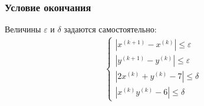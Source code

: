\subsubsection*{Условие окончания}
Величины \(\varepsilon\) и \(\delta\) задаются самостоятельно:
\begin{align}
	\begin{cases}
		|x^{(k+1)} - x^{(k)}| \leq \varepsilon \\
		|y^{(k+1)} - y^{(k)}| \leq \varepsilon \\
		|2x^{(k)} + y^{(k)} - 7| \leq \delta   \\
		|x^{(k)}y^{(k)} - 6| \leq \delta
	\end{cases}
\end{align}
